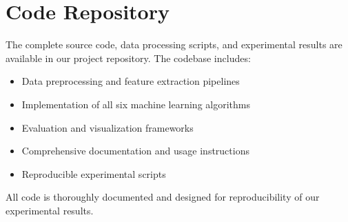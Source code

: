 \documentclass[11pt,a4paper]{article}
\begin{document}
\section{Code Repository}

The complete source code, data processing scripts, and experimental results are available in our project repository. The codebase includes:

\begin{itemize}
    \item Data preprocessing and feature extraction pipelines
    \item Implementation of all six machine learning algorithms
    \item Evaluation and visualization frameworks
    \item Comprehensive documentation and usage instructions
    \item Reproducible experimental scripts
\end{itemize}

All code is thoroughly documented and designed for reproducibility of our experimental results.
\end{document}
